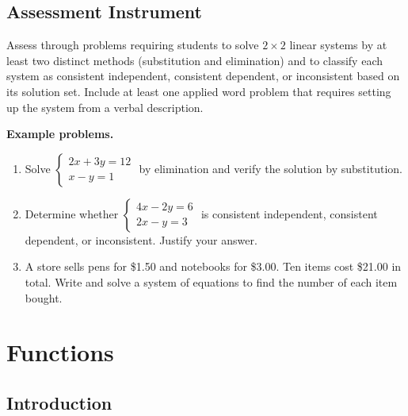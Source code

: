 \subsection{Assessment Instrument}
\label{ssec:asse-d238}

Assess through problems requiring students to solve $2 \times 2$ linear systems by at
least two distinct methods (substitution and elimination) and to classify each system as
consistent independent, consistent dependent, or inconsistent based on its solution set.
Include at least one applied word problem that requires setting up the system from a
verbal description.

\textbf{Example problems.}

\begin{enumerate}
    \item Solve $\begin{cases} 2x + 3y = 12 \\ x - y = 1 \end{cases}$ by elimination and verify the solution by substitution.
    \item Determine whether $\begin{cases} 4x - 2y = 6 \\ 2x - y = 3 \end{cases}$ is consistent independent, consistent dependent, or inconsistent. Justify your answer.
    \item A store sells pens for \$1.50 and notebooks for \$3.00. Ten items cost \$21.00 in total. Write and solve a system of equations to find the number of each item bought.
\end{enumerate}

\section{Functions}
\label{sec:func-0eaa}

\subsection{Introduction}
\label{sss:intr-8800}

